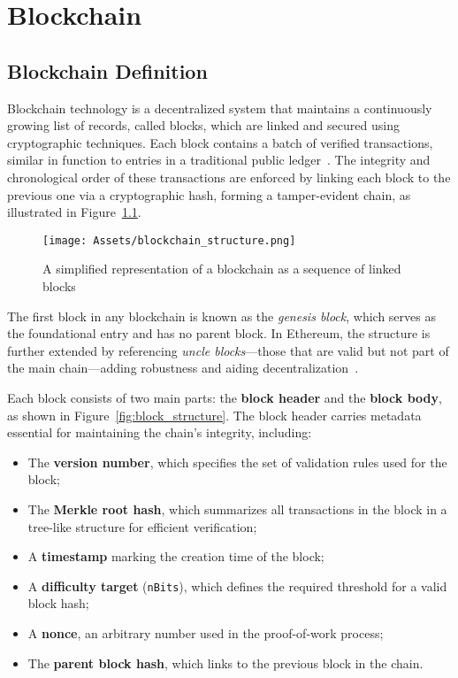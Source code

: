 
\chapter{Blockchain}
\section{Blockchain Definition}
Blockchain technology is a decentralized system that maintains a continuously growing list of records, called blocks, which are linked and secured using cryptographic techniques. Each block contains a batch of verified transactions, similar in function to entries in a traditional public ledger~\cite{lee2015handbook}. The integrity and chronological order of these transactions are enforced by linking each block to the previous one via a cryptographic hash, forming a tamper-evident chain, as illustrated in Figure~\ref{fig:blockchain_structure}.

\begin{figure}[H]
    \centering
    \texttt{[image: Assets/blockchain\_structure.png]}
    \caption{A simplified representation of a blockchain as a sequence of linked blocks}
    \label{fig:blockchain_structure}
\end{figure}

The first block in any blockchain is known as the \textit{genesis block}, which serves as the foundational entry and has no parent block. In Ethereum, the structure is further extended by referencing \textit{uncle blocks}—those that are valid but not part of the main chain—adding robustness and aiding decentralization~\cite{wood2014ethereum}.

Each block consists of two main parts: the \textbf{block header} and the \textbf{block body}, as shown in Figure~\ref{fig:block_structure}. The block header carries metadata essential for maintaining the chain’s integrity, including:
\begin{itemize}
    \item The \textbf{version number}, which specifies the set of validation rules used for the block;
    \item The \textbf{Merkle root hash}, which summarizes all transactions in the block in a tree-like structure for efficient verification;
    \item A \textbf{timestamp} marking the creation time of the block;
    \item A \textbf{difficulty target} (\texttt{nBits}), which defines the required threshold for a valid block hash;
    \item A \textbf{nonce}, an arbitrary number used in the proof-of-work process;
    \item The \textbf{parent block hash}, which links to the previous block in the chain.
\end{itemize}

